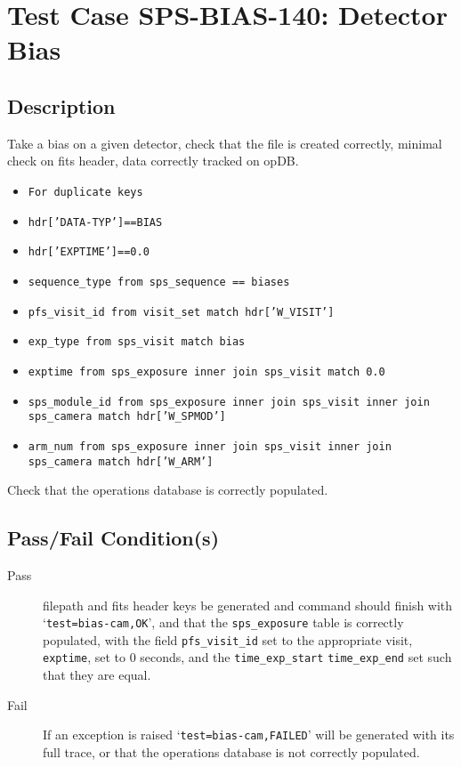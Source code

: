 \section{Test Case SPS-BIAS-140: Detector Bias}

\subsection{Description}

Take a bias on a given detector, check that the file is created correctly, minimal check on fits header, data correctly tracked on opDB.
\begin{itemize}
\item \texttt{For duplicate keys}
\item \texttt{hdr['DATA-TYP']==BIAS}
\item \texttt{hdr['EXPTIME']==0.0}
\item \texttt{sequence\_type from sps\_sequence == biases}
\item \texttt{pfs\_visit\_id from visit\_set match hdr['W\_VISIT']}
\item \texttt{exp\_type from sps\_visit match bias}
\item \texttt{exptime from sps\_exposure inner join sps\_visit match 0.0}
\item \texttt{sps\_module\_id from sps\_exposure inner join sps\_visit inner join sps\_camera match hdr['W\_SPMOD']}
\item \texttt{arm\_num from sps\_exposure inner join sps\_visit inner join sps\_camera match hdr['W\_ARM']}

\end{itemize}

Check that the operations database is correctly populated.

\subsection{Pass/Fail Condition(s)}

\begin{description}

\item [Pass] filepath and fits header keys be generated and command should finish with `\texttt{test=bias-cam,OK}', 
and that the \texttt{sps\_exposure} table is correctly populated, 
with the field \texttt{pfs\_visit\_id} set to the appropriate visit, \texttt{exptime}, set to 0 seconds, 
and the \texttt{time\_exp\_start} \texttt{time\_exp\_end} set such that they are equal.

\item [Fail] If an exception is raised `\texttt{test=bias-cam,FAILED}' will be generated with its full trace, 
or that the operations database is not correctly populated.

\end{description}

